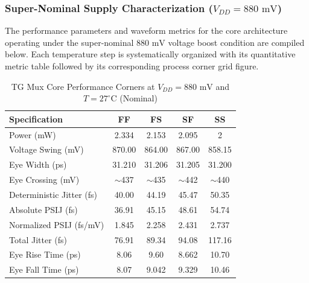 \clearpage

\subsubsection*{Super-Nominal Supply Characterization ($V_{DD} = 880\text{ mV}$)}

The performance parameters and waveform metrics for the core architecture operating under the super-nominal $880\text{ mV}$ voltage boost condition are compiled below. Each temperature step is systematically organized with its quantitative metric table followed by its corresponding process corner grid figure.

\begin{table}[H]
    \centering
    \renewcommand{\arraystretch}{1.3}
    \setlength{\tabcolsep}{10pt}
    \begin{tabular}{|l|c|c|c|c|}
        \hline
        \textbf{Specification} & \textbf{FF} & \textbf{FS} & \textbf{SF} & \textbf{SS} \\ \hline
        Power (mW) & 2.334 & 2.153 & 2.095 & 2 \\ \hline
        Voltage Swing (mV) & 870.00 & 864.00 & 867.00 & 858.15 \\ \hline
        Eye Width (ps) & 31.210 & 31.206 & 31.205 & 31.200 \\ \hline
        Eye Crossing (mV) & $\sim$437 & $\sim$435 & $\sim$442 & $\sim$440 \\ \hline
        Deterministic Jitter (fs) & 40.00 & 44.19 & 45.47 & 50.35 \\ \hline
        Absolute PSIJ (fs) & 36.91 & 45.15 & 48.61 & 54.74 \\ \hline
        Normalized PSIJ (fs/mV) & 1.845 & 2.258 & 2.431 & 2.737 \\ \hline
        Total Jitter (fs) & 76.91 & 89.34 & 94.08 & 117.16 \\ \hline
        Eye Rise Time (ps) & 8.06 & 9.60 & 8.662 & 10.70 \\ \hline
        Eye Fall Time (ps) & 8.07 & 9.042 & 9.329 & 10.46 \\ \hline
    \end{tabular}
    \vspace{2mm}
    \caption{TG Mux Core Performance Corners at $V_{DD} = 880\text{ mV}$ and $T = 27^{\circ}\text{C}$ (Nominal)}
    \label{tab:tg_corners_880_nominal}
\end{table}

